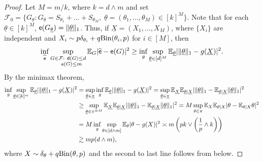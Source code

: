 \begin{proof}

Let $ M = m/k $, where $ k = d \wedge m $ and set $ \mathcal{F}_0 = \{ G_{\underline{\theta}} : G_{\underline{\theta}} = S_{\theta_1} + \dots + S_{\theta_M}, \; \underline{\theta} = (\theta_1,\dots,\theta_M) \in [k]^M \} $. Note that for each $ \underline{\theta} \in [k]^M $, $ {\mathsf{e}}(G_{\underline{\theta}}) = \|\underline{\theta}\|_1 $. Thus, if $ \underline{X} = (X_1, \dots, X_M) $, where $ \{X_i\} $ are independent and $ X_i \sim p \delta_{\theta_i} + q \mathrm{Bin}(\theta_i,p) $ for $ i \in [M] $, then
\begin{equation*}
\inf_{\widehat{{\mathsf{e}}}}\sup_{\substack{G \in {\mathcal{F}}: ~{\mathsf{d}}(G)\leq d\\ ~~~{\mathsf{e}}(G) \leq m}}\mathbb{E}_G|\widehat{{\mathsf{e}}}-{\mathsf{e}}(G)|^2 \geq \inf_{g}\sup_{ \underline{\theta} \in [d]^M }\mathbb{E}_{\underline{\theta}}|\|\underline{\theta}\|_1 - g(\underline{X})|^2.
\end{equation*}
By the minimax theorem,
\begin{align*}
\inf_{g}\sup_{ \underline{\theta} \in [k]^m }\mathbb{E}_{\underline{\theta}}|\|\underline{\theta}\|_1 - g(\underline{X})|^2 
& = \sup_{ \underline{\theta}\in \underline{\pi} }\inf_{g}\mathbb{E}_{\underline{\theta}}|\|\underline{\theta}\|_1 - g(\underline{X})|^2 = \sup_{ \underline{\theta} \in \underline{\pi} }\mathbb{E}_{\underline{X}}\mathbb{E}_{\underline{\theta}| \underline{X}}|\|\underline{\theta}\|_1 - \mathbb{E}_{\underline{\theta}|\underline{X}} \|\underline{\theta}\|_1|^2 \\
& \geq \sup_{ \underline{\theta} \in \pi^{\otimes M} }\mathbb{E}_{\underline{X}}\mathbb{E}_{\underline{\theta}| \underline{X}}|\|\underline{\theta}\|_1 - \mathbb{E}_{\underline{\theta}|\underline{X}} \|\underline{\theta}\|_1|^2
 = M\sup_{ \theta \in \pi } \mathbb{E}_X\mathbb{E}_{\theta|X}|\theta - \mathbb{E}_{\theta|X}\theta|^2 \\
& =  M\inf_{g}\sup_{ \theta \in [d \wedge m] }\mathbb{E}_\theta|\theta - g(X)|^2
\asymp m\left(p k\vee \left(  \frac{1}{p} \wedge k  \right) \right) \\
& \gtrsim mp(d \wedge m),
\end{align*}
where $ X \sim \delta_{\theta} + q \mathrm{Bin}(\theta, p) $ and the second to last line follows from  below. 
\end{proof}

